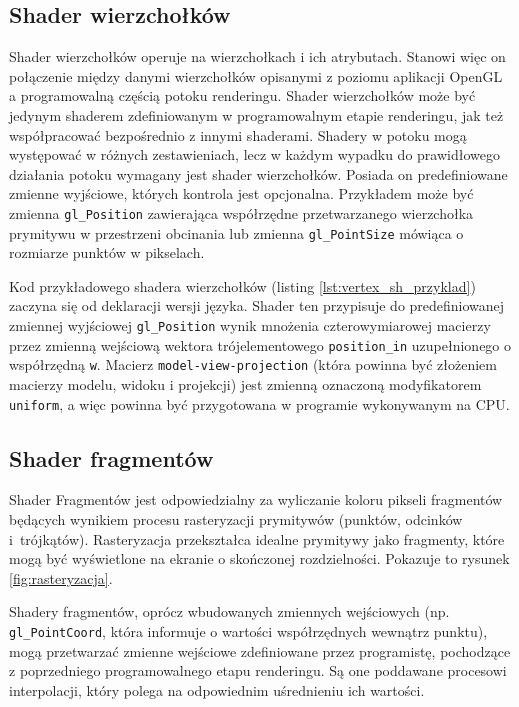 \documentclass[12pt, twoside, openany]{report}
\begin{document}
\subsection{Shader wierzchołków}
\label{shader_wierzcholkow}

Shader wierzchołków operuje na wierzchołkach i ich atrybutach. Stanowi więc on połączenie między danymi wierzchołków opisanymi z poziomu aplikacji OpenGL a programowalną częścią potoku renderingu.
Shader wierzchołków może być jedynym shaderem zdefiniowanym w programowalnym etapie renderingu, jak też współpracować bezpośrednio z innymi shaderami. Shadery w potoku mogą występować w różnych zestawieniach, lecz w każdym wypadku do prawidłowego działania potoku wymagany jest shader wierzchołków.
Posiada on predefiniowane zmienne wyjściowe, których kontrola jest opcjonalna. Przykładem może być zmienna \texttt{gl\_Position} zawierająca współrzędne przetwarzanego wierzchołka prymitywu w przestrzeni obcinania lub zmienna \texttt{gl\_PointSize} mówiąca o rozmiarze punktów w pikselach.

Kod przykładowego shadera wierzchołków (listing \ref{lst:vertex_sh_przyklad}) zaczyna się od deklaracji wersji języka. Shader ten przypisuje do predefiniowanej zmiennej wyjściowej \texttt{gl\_Position} wynik mnożenia czterowymiarowej macierzy przez zmienną wejściową wektora trójelementowego \texttt{position\_in} uzupełnionego o współrzędną \texttt{w}. Macierz \texttt{model-view-projection} (która powinna być złożeniem macierzy modelu, widoku i projekcji) jest zmienną oznaczoną modyfikatorem \texttt{uniform}, a więc powinna być przygotowana w programie wykonywanym na CPU.



\subsection{Shader fragmentów}
\label{shader_fragmentow}

Shader Fragmentów jest odpowiedzialny za wyliczanie koloru pikseli fragmentów będących wynikiem procesu rasteryzacji prymitywów (punktów, odcinków i~trójkątów). Rasteryzacja przekształca idealne prymitywy jako fragmenty, które mogą być wyświetlone na ekranie o skończonej rozdzielności. Pokazuje to rysunek \ref{fig:rasteryzacja}.

Shadery fragmentów, oprócz wbudowanych zmiennych wejściowych (np.\\\texttt{gl\_PointCoord}, która informuje o wartości współrzędnych wewnątrz punktu), mogą przetwarzać zmienne wejściowe zdefiniowane przez programistę, pochodzące z poprzedniego programowalnego etapu renderingu. Są one poddawane procesowi interpolacji, który polega na odpowiednim uśrednieniu ich wartości.
\end{document}
